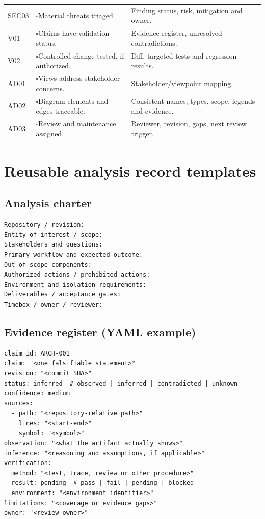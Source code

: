 \documentclass[11pt,letterpaper]{article}
\newcommand{\checkitem}[1]{\(\square\)\hspace{0.4em}#1}
\begin{document}
\begin{longtable}{@{}P{0.48in}P{3.0in}P{2.75in}@{}}
SEC03 & \checkitem{Material threats triaged.} & Finding status, risk, mitigation and owner.\\
V01 & \checkitem{Claims have validation status.} & Evidence register, unresolved contradictions.\\
V02 & \checkitem{Controlled change tested, if authorized.} & Diff, targeted tests and regression results.\\
AD01 & \checkitem{Views address stakeholder concerns.} & Stakeholder/viewpoint mapping.\\
AD02 & \checkitem{Diagram elements and edges traceable.} & Consistent names, types, scope, legends and evidence.\\
AD03 & \checkitem{Review and maintenance assigned.} & Reviewer, revision, gaps, next review trigger.\\
\bottomrule
\end{longtable}
\clearpage
\section{Reusable analysis record templates}
\subsection{Analysis charter}
\begin{lstlisting}
Repository / revision:
Entity of interest / scope:
Stakeholders and questions:
Primary workflow and expected outcome:
Out-of-scope components:
Authorized actions / prohibited actions:
Environment and isolation requirements:
Deliverables / acceptance gates:
Timebox / owner / reviewer:
\end{lstlisting}
\subsection{Evidence register (YAML example)}
\begin{lstlisting}
claim_id: ARCH-001
claim: "<one falsifiable statement>"
revision: "<commit SHA>"
status: inferred  # observed | inferred | contradicted | unknown
confidence: medium
sources:
  - path: "<repository-relative path>"
    lines: "<start-end>"
    symbol: "<symbol>"
observation: "<what the artifact actually shows>"
inference: "<reasoning and assumptions, if applicable>"
verification:
  method: "<test, trace, review or other procedure>"
  result: pending  # pass | fail | pending | blocked
  environment: "<environment identifier>"
limitations: "<coverage or evidence gaps>"
owner: "<review owner>"
\end{lstlisting}
\end{document}

